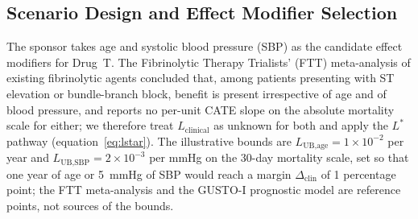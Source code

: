 \documentclass[AMA,Times1COL]{WileyNJDv5}
\begin{document}
\subsection{Scenario Design and Effect Modifier Selection}\label{sec:app_scenario}

The sponsor takes age and systolic blood pressure (SBP) as the candidate effect modifiers for Drug~T. The Fibrinolytic Therapy Trialists' (FTT) meta-analysis of existing fibrinolytic agents\cite{ftt1994} concluded that, among patients presenting with ST elevation or bundle-branch block, benefit is present irrespective of age and of blood pressure, and reports no per-unit CATE slope on the absolute mortality scale for either; we therefore treat $L_{\text{clinical}}$ as unknown for both and apply the $L^*$ pathway (equation~\ref{eq:lstar}). The illustrative bounds are $L_{\text{UB,age}} = 1 \times 10^{-2}$ per year and $L_{\text{UB,SBP}} = 2 \times 10^{-3}$ per mmHg on the 30-day mortality scale, set so that one year of age or 5~mmHg of SBP would reach a margin $\Delta_{\text{clin}}$ of 1 percentage point; the FTT meta-analysis\cite{ftt1994} and the GUSTO-I prognostic model\cite{lee1995} are reference points, not sources of the bounds.
\end{document}

